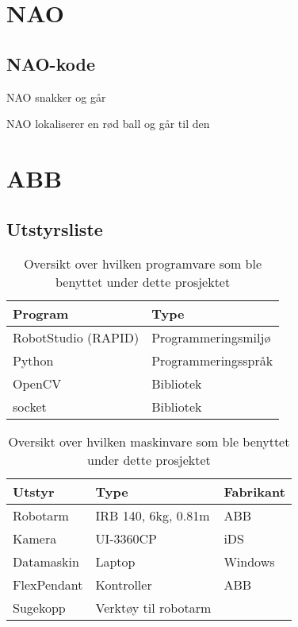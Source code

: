 \section{NAO}
\subsection{NAO-kode}
NAO snakker og går

NAO lokaliserer en rød ball og går til den


\section{ABB}
\subsection{Utstyrsliste}
\begin{table}[!htb]
    \centering
    \caption{Oversikt over hvilken programvare som ble benyttet under dette prosjektet}
    \begin{tabular}{|l|l|}
        \hline
        \textbf{Program} & \textbf{Type}\\
        \hline
        RobotStudio (RAPID) & Programmeringsmiljø\\
        \hline
        Python & Programmeringsspråk \\
        \hline
        OpenCV & Bibliotek \\
        \hline
        socket & Bibliotek \\
        \hline
    \end{tabular} \newline
    \label{app:soft}
\end{table}
\begin{table}[!htb]
    \centering
    \caption{Oversikt over hvilken maskinvare som ble benyttet under dette prosjektet}
    \begin{tabular}{|l|l|l|}
        \hline
        \textbf{Utstyr} & \textbf{Type} & \textbf{Fabrikant}\\
        \hline
        Robotarm & IRB 140, 6kg, 0.81m & ABB\\
        \hline
        Kamera & UI-3360CP & iDS\\
        \hline
        Datamaskin & Laptop & Windows \\
        \hline
        FlexPendant & Kontroller & ABB \\
        \hline
        Sugekopp & Verktøy til robotarm &  \\
        \hline
    \end{tabular} \newline
    \label{app:hard}
\end{table}

